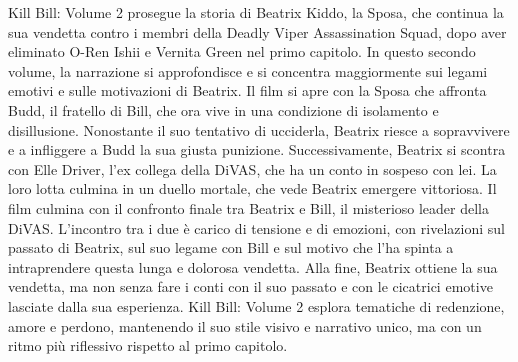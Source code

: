 \documentclass[12pt]{article} %
\begin{document}
\begin{flushleft}
    Kill Bill: Volume 2 prosegue la storia di Beatrix Kiddo, la Sposa, che continua la sua vendetta contro i membri della Deadly Viper Assassination Squad, dopo aver eliminato O-Ren Ishii e Vernita Green nel primo capitolo. In questo secondo volume, la narrazione si approfondisce e si concentra maggiormente sui legami emotivi e sulle motivazioni di Beatrix. 
    Il film si apre con la Sposa che affronta Budd, il fratello di Bill, che ora vive in una condizione di isolamento e disillusione. Nonostante il suo tentativo di ucciderla, Beatrix riesce a sopravvivere e a infliggere a Budd la sua giusta punizione. Successivamente, Beatrix si scontra con Elle Driver, l'ex collega della DiVAS, che ha un conto in sospeso con lei. La loro lotta culmina in un duello mortale, che vede Beatrix emergere vittoriosa. 
    Il film culmina con il confronto finale tra Beatrix e Bill, il misterioso leader della DiVAS. L'incontro tra i due è carico di tensione e di emozioni, con rivelazioni sul passato di Beatrix, sul suo legame con Bill e sul motivo che l'ha spinta a intraprendere questa lunga e dolorosa vendetta. Alla fine, Beatrix ottiene la sua vendetta, ma non senza fare i conti con il suo passato e con le cicatrici emotive lasciate dalla sua esperienza. 
    Kill Bill: Volume 2 esplora tematiche di redenzione, amore e perdono, mantenendo il suo stile visivo e narrativo unico, ma con un ritmo più riflessivo rispetto al primo capitolo.
\end{flushleft}
\break
\end{document}
